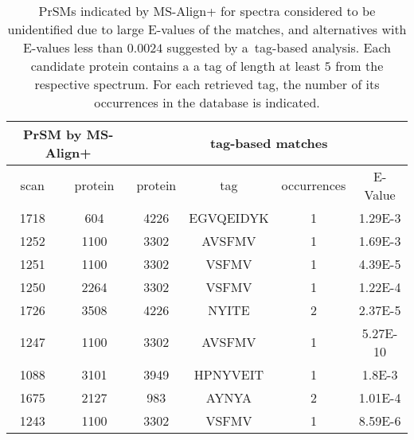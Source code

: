 \documentclass{article}
\begin{document}
\begin{table}[h]\footnotesize
\vspace{3mm}\
{\centering
\begin{center}
\begin{tabular}{|c|c||c|c|c|c|}
  \hline
  \multicolumn{2}{|c||}{PrSM by MS-Align+} & \multicolumn{4}{|c|}{tag-based matches} \\
  \hline
  scan & protein & protein & tag & occurrences & E-Value\\

  \hline
1718& 604 & 4226& 
EGVQEIDYK & 1 & 1.29E-3\\
  \hline
1252& 1100 & 3302& 
AVSFMV & 1 & 1.69E-3\\
  \hline
1251& 1100 & 3302& 
VSFMV & 1 & 4.39E-5\\
  \hline
1250& 2264 & 3302& 
VSFMV & 1 & 1.22E-4\\
  \hline
1726& 3508 & 4226& 
NYITE & 2 & 2.37E-5\\
  \hline
1247& 1100 & 3302& 
AVSFMV & 1 & 5.27E-10\\
  \hline
1088& 3101 & 3949& 
HPNYVEIT & 1 & 1.8E-3\\
  \hline
1675& 2127 & 983& 
AYNYA & 2 & 1.01E-4\\
  \hline
1243& 1100 & 3302& 
VSFMV & 1 & 8.59E-6\\
\hline\end{tabular}
\end{center}
\par}
\centering
\caption{PrSMs indicated by MS-Align+ for spectra considered to be unidentified due to large E-values of the matches, and alternatives with E-values less than $0.0024$ suggested by a~tag-based analysis. Each candidate protein contains a a tag of length at least $5$ from the respective spectrum. For each retrieved tag, the number of its occurrences in the database is indicated.}
\vspace{3mm}
\label{table:unident-spectra}
\end{table}
\end{document}
